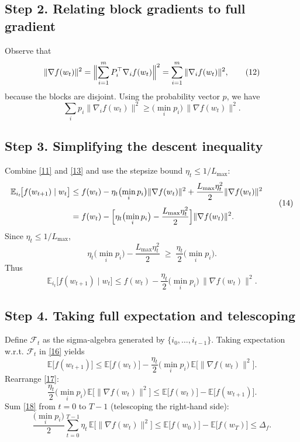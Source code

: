 \documentclass{article}
\begin{document}
\subsection*{Step 2. Relating block gradients to full gradient}
Observe that
\[
\|\nabla f(w_t)\|^{2}
= \Bigl\|\sum_{i=1}^{m}P_i^{\top}\nabla_i f(w_t)\Bigr\|^{2}
= \sum_{i=1}^{m}\|\nabla_i f(w_t)\|^{2},
\tag{12}
\]
because the blocks are disjoint.  Using the probability vector $p$, we have
\[
\sum_{i}p_i\|\nabla_i f(w_t)\|^{2}
\ge \bigl(\min_i p_i\bigr)\,\|\nabla f(w_t)\|^{2}.
\tag{13}
\]

\subsection*{Step 3. Simplifying the descent inequality}
Combine \eqref{11} and \eqref{13} and use the stepsize bound $\eta_t\le 1/L_{\max}$:
\[
\begin{aligned}
\mathbb{E}_{i_t}\!\bigl[f(w_{t+1})\mid w_t\bigr]
&\le f(w_t)-\eta_t\bigl(\min_i p_i\bigr)\|\nabla f(w_t)\|^{2}
+\frac{L_{\max}\eta_t^{2}}{2}\|\nabla f(w_t)\|^{2}\\[4pt]
&= f(w_t)-\Bigl[\eta_t\bigl(\min_i p_i\bigr)-\frac{L_{\max}\eta_t^{2}}{2}\Bigr]\|\nabla f(w_t)\|^{2}.
\end{aligned}
\tag{14}
\]
Since $\eta_t\le 1/L_{\max}$,
\[
\eta_t\bigl(\min_i p_i\bigr)-\frac{L_{\max}\eta_t^{2}}{2}
\;\ge\;
\frac{\eta_t}{2}\bigl(\min_i p_i\bigr).
\tag{15}
\]
Thus
\[
\mathbb{E}_{i_t}\!\bigl[f(w_{t+1})\mid w_t\bigr]
\le
f(w_t)-\frac{\eta_t}{2}\bigl(\min_i p_i\bigr)\,\|\nabla f(w_t)\|^{2}.
\tag{16}
\]

\subsection*{Step 4. Taking full expectation and telescoping}
Define $\mathcal{F}_t$ as the sigma‑algebra generated by $\{i_0,\dots ,i_{t-1}\}$.
Taking expectation w.r.t. $\mathcal{F}_t$ in \eqref{16} yields
\[
\mathbb{E}\!\bigl[f(w_{t+1})\bigr]
\le
\mathbb{E}\!\bigl[f(w_{t})\bigr]
-\frac{\eta_t}{2}\bigl(\min_i p_i\bigr)\,
\mathbb{E}\!\bigl[\|\nabla f(w_t)\|^{2}\bigr].
\tag{17}
\]
Rearrange \eqref{17}:
\[
\frac{\eta_t}{2}\bigl(\min_i p_i\bigr)\,
\mathbb{E}\!\bigl[\|\nabla f(w_t)\|^{2}\bigr]
\le
\mathbb{E}\!\bigl[f(w_{t})\bigr]-\mathbb{E}\!\bigl[f(w_{t+1})\bigr].
\tag{18}
\]
Sum \eqref{18} from $t=0$ to $T-1$ (telescoping the right‑hand side):
\[
\frac{\bigl(\min_i p_i\bigr)}{2}\sum_{t=0}^{T-1}\eta_t\,
\mathbb{E}\!\bigl[\|\nabla f(w_t)\|^{2}\bigr]
\le
\mathbb{E}\!\bigl[f(w_{0})\bigr]-\mathbb{E}\!\bigl[f(w_{T})\bigr]
\le \Delta_f .
\tag{19}
\]
\end{document}
